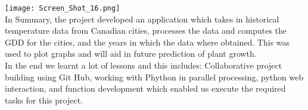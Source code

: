 \texttt{[image: Screen\_Shot\_16.png]}\\

In Summary, the project developed an application which  takes in historical temperature data from Canadian cities, processes the data and computes the GDD  for the cities, and the years in which the data where obtained. This was used to plot graphs and will aid in future prediction of plant growth.\\
In the end we learnt a lot of lessons and this includes: Collaborative project building using Git Hub, working with Phython in parallel processing, python web interaction, and function development which enabled us execute the required tasks for this project. 


